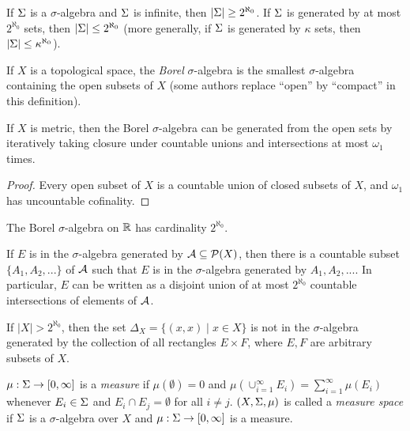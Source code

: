 \documentclass[letterpaper,11pt]{report}
\begin{document}
\begin{prop} If $\Sigma$ is a $\sigma$-algebra and $\Sigma$ is infinite, then $|\Sigma| \ge 2^{\aleph_0}$. If $\Sigma$ is generated by at most $2^{\aleph_0}$ sets, then $|\Sigma| \le 2^{\aleph_0}$ (more generally, if $\Sigma$ is generated by $\kappa$ sets, then $|\Sigma| \le \kappa^{\aleph_0}$).
\end{prop}

\begin{defn} If $X$ is a topological space, the \emph{Borel} $\sigma$-algebra is the smallest $\sigma$-algebra containing the open subsets of $X$ (some authors replace ``open'' by ``compact'' in this definition).
\end{defn}

\begin{prop} If $X$ is metric, then the Borel $\sigma$-algebra can be generated from the open sets by iteratively taking closure under countable unions and intersections at most $\omega_1$ times.
\end{prop}
\begin{proof} Every open subset of $X$ is a countable union of closed subsets of $X$, and $\omega_1$ has uncountable cofinality.
\end{proof}

\begin{cor} The Borel $\sigma$-algebra on $\mathbb{R}$ has cardinality $2^{\aleph_0}$.
\end{cor}

\begin{prop} If $E$ is in the $\sigma$-algebra generated by $\mathcal{A} \subseteq \mathcal{P}(X)$, then there is a countable subset $\{A_1, A_2, ...\}$ of $\mathcal{A}$ such that $E$ is in the $\sigma$-algebra generated by $A_1, A_2, ...$. In particular, $E$ can be written as a disjoint union of at most $2^{\aleph_0}$ countable intersections of elements of $\mathcal{A}$.
\end{prop}

\begin{cor}\label{nedoma} If $|X| > 2^{\aleph_0}$, then the set $\Delta_X = \{(x,x) \mid x \in X\}$ is not in the $\sigma$-algebra generated by the collection of all rectangles $E\times F$, where $E,F$ are arbitrary subsets of $X$.
\end{cor}

\begin{defn} $\mu:\Sigma \rightarrow [0,\infty]$ is a \emph{measure} if $\mu(\emptyset) = 0$ and $\mu(\cup_{i=1}^\infty E_i) = \sum_{i=1}^\infty \mu(E_i)$ whenever $E_i \in \Sigma$ and $E_i \cap E_j = \emptyset$ for all $i \ne j$. $(X,\Sigma, \mu)$ is called a \emph{measure space} if $\Sigma$ is a $\sigma$-algebra over $X$ and $\mu : \Sigma \rightarrow [0,\infty]$ is a measure.
\end{defn}
\end{document}
